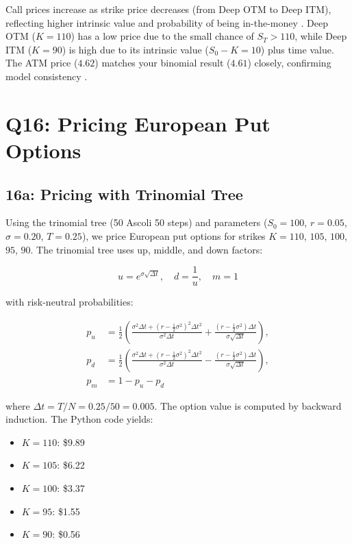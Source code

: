 \documentclass{article}
\begin{document}
Call prices increase as strike price decreases (from Deep OTM to Deep ITM), reflecting higher intrinsic value and probability of being in-the-money \citep{hull2018options}. Deep OTM ($K=110$) has a low price due to the small chance of $S_T > 110$, while Deep ITM ($K=90$) is high due to its intrinsic value ($S_0 - K = 10$) plus time value. The ATM price ($4.62$) matches your binomial result ($4.61$) closely, confirming model consistency \citep{shreve2004stochastic}.


\section*{Q16: Pricing European Put Options}

\subsection*{16a: Pricing with Trinomial Tree}

Using the trinomial tree (50 Ascoli 50 steps) and parameters ($S_0 = 100$, $r = 0.05$, $\sigma = 0.20$, $T = 0.25$), we price European put options for strikes $K=110$, $105$, $100$, $95$, $90$. The trinomial tree uses up, middle, and down factors:

\begin{equation}
u = e^{\sigma \sqrt{\Delta t}}, \quad d = \frac{1}{u}, \quad m = 1
\end{equation}

with risk-neutral probabilities:

\begin{align}
p_u &= \frac{1}{2} \left( \frac{\sigma^2 \Delta t + (r - \frac{1}{2} \sigma^2)^2 \Delta t^2}{\sigma^2 \Delta t} + \frac{(r - \frac{1}{2} \sigma^2) \Delta t}{\sigma \sqrt{\Delta t}} \right), \\ 
p_d &= \frac{1}{2} \left( \frac{\sigma^2 \Delta t + (r - \frac{1}{2} \sigma^2)^2 \Delta t^2}{\sigma^2 \Delta t} - \frac{(r - \frac{1}{2} \sigma^2) \Delta t}{\sigma \sqrt{\Delta t}} \right), \\
p_m &= 1 - p_u - p_d
\end{align}

where $\Delta t = T/N = 0.25/50 = 0.005$. The option value is computed by backward induction. The Python code yields:

\begin{itemize}
    \item $K=110$: \$9.89
    \item $K=105$: \$6.22
    \item $K=100$: \$3.37
    \item $K=95$: \$1.55
    \item $K=90$: \$0.56
\end{itemize}
\end{document}
